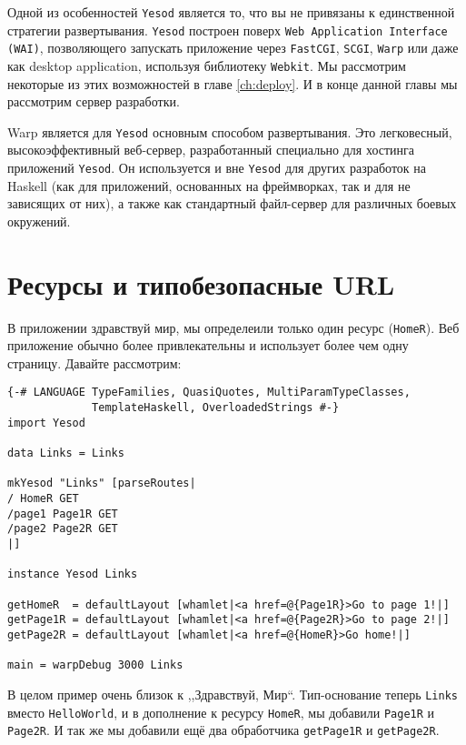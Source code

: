 Одной из особенностей \texttt{Yesod} является то, что вы не привязаны к единственной
стратегии развертывания. \texttt{Yesod} построен поверх \texttt{Web Application Interface
  (WAI)}, позволяющего запускать приложение через \texttt{FastCGI}, \texttt{SCGI},
\texttt{Warp} или даже как desktop application, используя
библиотеку \texttt{Webkit}. Мы рассмотрим некоторые из этих возможностей в главе
\ref{ch:deploy}. И в конце данной главы мы рассмотрим сервер разработки.

Warp является для \texttt{Yesod} основным способом развертывания. Это легковесный,
высокоэффективный веб-сервер, разработанный специально для хостинга приложений
\texttt{Yesod}. Он используется и вне \texttt{Yesod} для других разработок на
Haskell (как для приложений, основанных на фреймворках, так и для не зависящих от них), а
также как стандартный файл-сервер для различных боевых окружений.

\section{Ресурсы и типобезопасные URL}

В приложении здравствуй мир, мы определеили только один ресурс 
(\lstinline!HomeR!). Веб приложение обычно более привлекательны и  использует более чем одну страницу. Давайте рассмотрим:

\begin{lstlisting}
{-# LANGUAGE TypeFamilies, QuasiQuotes, MultiParamTypeClasses,
             TemplateHaskell, OverloadedStrings #-}
import Yesod

data Links = Links

mkYesod "Links" [parseRoutes|
/ HomeR GET
/page1 Page1R GET
/page2 Page2R GET
|]

instance Yesod Links

getHomeR  = defaultLayout [whamlet|<a href=@{Page1R}>Go to page 1!|]
getPage1R = defaultLayout [whamlet|<a href=@{Page2R}>Go to page 2!|]
getPage2R = defaultLayout [whamlet|<a href=@{HomeR}>Go home!|]

main = warpDebug 3000 Links
\end{lstlisting}

В целом пример очень близок к ,,Здравствуй, Мир``. Тип-основание
теперь \lstinline!Links! вместо \lstinline!HelloWorld!, и в дополнение 
к ресурсу \lstinline!HomeR!, мы добавили \lstinline!Page1R! и 
\lstinline!Page2R!. И так же мы добавили ещё 
два обработчика \lstinline!getPage1R! и \lstinline!getPage2R!.

